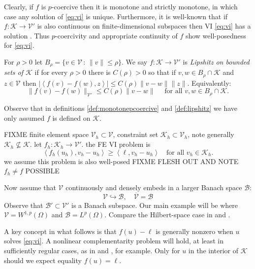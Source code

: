 \documentclass[hidelinks,onefignum,onetabnum,final]{siamart220329}  %
\newcommand{\cB}{\mathcal{B}}
\newcommand{\cK}{\mathcal{K}}
\newcommand{\cV}{\mathcal{V}}
\newcommand{\ip}[2]{\left<#1,#2\right>}
\begin{document}
Clearly, if $f$ is $p$-coercive then it is monotone and strictly monotone, in which case any solution of \eqref{eq:vi} is unique.  Furthermore, it is well-known that if $f:\cK \to \cV'$ is also continuous on finite-dimensional subspaces then VI \eqref{eq:vi} has a solution \cite[Corollary III.1.8]{KinderlehrerStampacchia1980}.  Thus $p$-coercivity and appropriate continuity of $f$ show well-posedness for \eqref{eq:vi}.


\begin{definition} \label{def:lipshitz}
For $\rho>0$ let $B_\rho = \{v\in \cV\,:\,\|v\|\le \rho\}$.  We say $f:\cK \to \cV'$ is \emph{Lipshitz on bounded sets of $\cK$} if for every $\rho>0$ there is $C(\rho)>0$ so that if $v,w \in B_\rho \cap \cK$ and $z\in\cV$ then $|\ip{f(v)-f(w)}{z}| \le C(\rho) \|v-w\| \|z\|$.  Equivalently:
\begin{equation}
\|f(v)-f(w)\|_{\cV'} \le C(\rho) \|v-w\| \quad \text{ for all } v,w \in B_\rho \cap \cK.  \label{eq:liponbounded}
\end{equation}
\end{definition}

Observe that in definitions \ref{def:monotonepcoercive} and \ref{def:lipshitz} we have only assumed $f$ is defined on $\cK$.

FIXME finite element space $\cV_h \subset \cV$, constraint set $\cK_h\subset \cV_h$, note generally $\cK_h \nsubseteq \cK$.  let $f_h:\cK_h\to\cV'$.  the FE VI problem is
\begin{equation}
\ip{f_h(u_h)}{v_h-u_h} \ge \ip{\ell}{v_h-u_h} \quad \text{for all } v_h\in \cK_h. \label{eq:fe:vi}
\end{equation}
we assume this problem is also well-posed FIXME FLESH OUT AND NOTE $f_h\ne f$ POSSIBLE

Now assume that $\cV$ continuously and densely embeds in a larger Banach space $\cB$:
\begin{equation}
\cV \hookrightarrow \cB, \quad \overline{\cV} = \cB
\end{equation}
Observe that $\cB' \subset \cV'$ is a Banach subspace.  Our main example will be where $\cV=W^{1,p}(\Omega)$ and $\cB=L^p(\Omega)$.  Compare the Hilbert-space case in \cite{Falk1974} and \cite[section 5.1]{Ciarlet2002}.

A key concept in what follows is that $f(u)-\ell$ is generally nonzero when $u$ solves \eqref{eq:vi}.  A nonlinear complementarity problem will hold, at least in sufficiently regular cases, as in \cite[Exercise 5.1.1]{Ciarlet2002}  and \cite[section 7]{BuelerFarrell2024}, for example.  Only for $u$ in the interior of $\cK$ should we expect equality $f(u)=\ell$.
\end{document}
